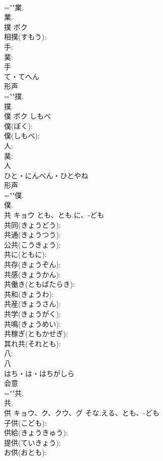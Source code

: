 \documentclass[8pt]{extreport}
\begin{document}
\begin{CJK}{UTF8}{min}
\\	=""業.
\\	業.
\\	撲	ボク			
\\	相撲(すもう): 
\\	手: 
\\	菐: 
\\	手	
\\	て・てへん	
\\	形声 
\\	=""撲.
\\	撲.
\\	僕	ボク	しもべ		
\\	僕(ぼく): 
\\	僕(しもべ): 
\\	人: 
\\	菐: 
\\	人	
\\	ひと・にんべん・ひとやね	
\\	形声 
\\	=""僕.
\\	僕.
\\	共	キョウ	とも、とも.に、-ども		
\\	共同(きょうどう): 
\\	共通(きょうつう): 
\\	公共(こうきょう): 
\\	共に(ともに): 
\\	共存(きょうぞん): 
\\	共感(きょうかん): 
\\	共働き(ともばたらき): 
\\	共和(きょうわ): 
\\	共産(きょうさん): 
\\	共学(きょうがく): 
\\	共鳴(きょうめい): 
\\	共稼ぎ(ともかせぎ): 
\\	其れ共(それとも): 
\\	八: 
\\	八	
\\	はち・は・はちがしら	
\\	会意 
\\	=""共.
\\	共.
\\	供	キョウ、ク、クウ、グ	そな.える、とも、-ども		
\\	子供(こども): 
\\	供給(きょうきゅう): 
\\	提供(ていきょう): 
\\	お供(おとも): 

\end{CJK}
\end{document}

